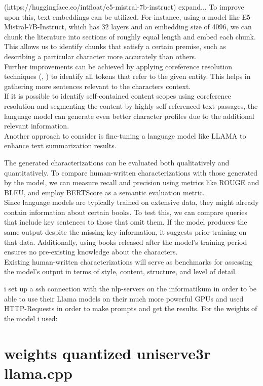 (https://huggingface.co/intfloat/e5-mistral-7b-instruct) expand...
To improve upon this, text embeddings can be utilized. For instance, using a model like E5-Mistral-7B-Instruct, which has 32 layers and an embedding size of 4096, we can chunk the literature into sections of roughly equal length and embed each chunk. This allows us to identify chunks that satisfy a certain premise, such as describing a particular character more accurately than others.\\

Further improvements can be achieved by applying coreference resolution techniques (\cite{schroder-etal-2021-neural}, \cite{dobrovolskii-2021-word}) to identify all tokens that refer to the given entity. This helps in gathering more sentences relevant to the characters context.\\

If it is possible to identify self-contained content scopes using coreference resolution and segmenting the content by highly self-referenced text passages, the language model can generate even better character profiles due to the additional relevant information.\\



Another approach to consider is fine-tuning a language model like LLAMA to enhance text summarization results.\

The generated characterizations can be evaluated both qualitatively and quantitatively. To compare human-written characterizations with those generated by the model, we can measure recall and precision using metrics like ROUGE and BLEU, and employ BERTScore as a semantic evaluation metric.\\

Since language models are typically trained on extensive data, they might already contain information about certain books. To test this, we can compare queries that include key sentences to those that omit them. If the model produces the same output despite the missing key information, it suggests prior training on that data. Additionally, using books released after the model's training period ensures no pre-existing knowledge about the characters.\\

Existing human-written characterizations will serve as benchmarks for assessing the model's output in terms of style, content, structure, and level of detail.


i set up a ssh connection with the nlp-servers on the informatikum in order to be
able to use their Llama models on their much more powerful GPUs and used HTTP-Requests
in order to make prompts and get the results. For the weights of the model i used: 


\section{weights quantized uniserve3r llama.cpp}
